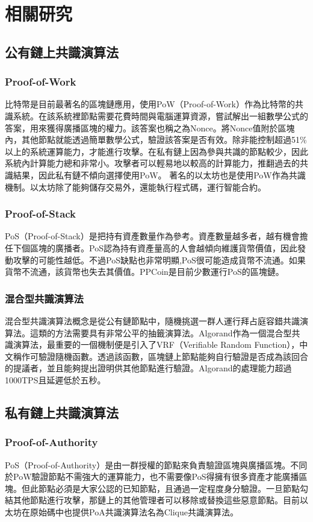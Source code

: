 \chapter{相關研究}\label{se_7}
\section{公有鏈上共識演算法}\label{se_7}
\subsection{Proof-of-Work}\label{se_7} 
比特幣是目前最著名的區塊鏈應用，使用PoW（Proof-of-Work）作為比特幣的共識系統。在該系統裡節點需要花費時間與電腦運算資源，嘗試解出一組數學公式的答案，用來獲得廣播區塊的權力。該答案也稱之為Nonce。將Nonce值附於區塊內，其他節點就能透過簡單數學公式，驗證該答案是否有效。除非能控制超過51\%以上的系統運算能力，才能進行攻擊。在私有鏈上因為參與共識的節點較少，因此系統內計算能力總和非常小。攻擊者可以輕易地以較高的計算能力，推翻過去的共識結果，因此私有鏈不傾向選擇使用PoW。
著名的以太坊\cite{Ethereum}也是使用PoW作為共識機制。以太坊除了能夠儲存交易外，還能執行程式碼，運行智能合約。
\subsection{Proof-of-Stack}\label{se_7}
PoS（Proof-of-Stack）是把持有資產數量作為參考。資產數量越多者，越有機會擔任下個區塊的廣播者。PoS認為持有資產量高的人會越傾向維護貨幣價值，因此發動攻擊的可能性越低。不過PoS缺點也非常明顯,PoS很可能造成貨幣不流通。如果貨幣不流通，該貨幣也失去其價值。PPCoin\cite{vasin2014blackcoin}是目前少數運行PoS的區塊鏈。
\subsection{混合型共識演算法}\label{se_7}
混合型共識演算法概念是從公有鏈節點中，隨機挑選一群人運行拜占庭容錯共識演算法。這類的方法需要具有非常公平的抽籤演算法。Algorand\cite{gilad2017algorand}作為一個混合型共識演算法，最重要的一個機制便是引入了VRF（Verifiable Random Function），中文稱作可驗證隨機函數。透過該函數，區塊鏈上節點能夠自行驗證是否成為該回合的提議者，並且能夠提出證明供其他節點進行驗證。Algorand的處理能力超過1000TPS且延遲低於五秒。


\section{私有鏈上共識演算法}\label{se_7}
\subsection{Proof-of-Authority}\label{se_7}
PoS（Proof-of-Authority）是由一群授權的節點來負責驗證區塊與廣播區塊。不同於PoW驗證節點不需強大的運算能力，也不需要像PoS得擁有很多資產才能廣播區塊。但此節點必須是大家公認的已知節點，且通過一定程度身分驗證。一旦節點勾結其他節點進行攻擊，那鏈上的其他管理者可以移除或替換這些惡意節點。目前以太坊在原始碼中也提供PoA共識演算法名為Clique共識演算法。

